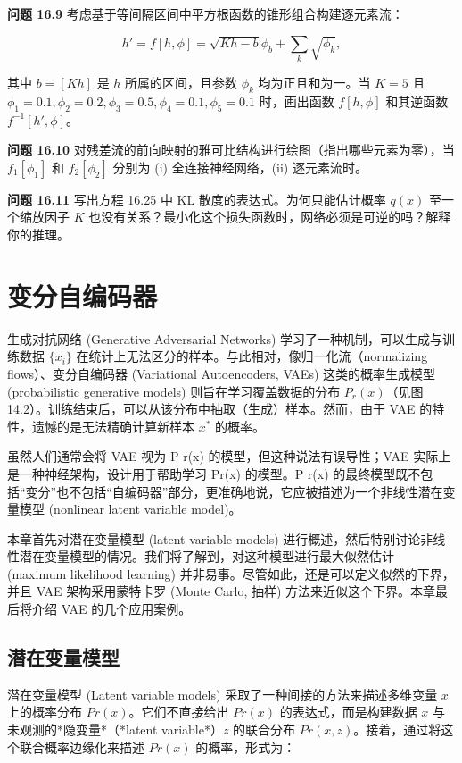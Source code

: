 \documentclass[lang=cn,newtx,10pt,scheme=chinese]{elegantbook}
\begin{document}
\textbf{问题 16.9} 考虑基于等间隔区间中平方根函数的锥形组合构建逐元素流：

\begin{equation}
h' = f[h, \phi] = \sqrt{K h - b} \phi_b + \sum_{k} \sqrt{\phi_k}, 
\end{equation}

其中 \(b = [Kh]\) 是 \(h\) 所属的区间，且参数 \(\phi_k\) 均为正且和为一。当 \(K = 5\) 且 \(\phi_1 = 0.1, \phi_2 = 0.2, \phi_3 = 0.5, \phi_4 = 0.1, \phi_5 = 0.1\) 时，画出函数 \(f[h, \phi]\) 和其逆函数 \(f^{-1}[h', \phi]\)。

\textbf{问题 16.10} 对残差流的前向映射的雅可比结构进行绘图（指出哪些元素为零），当 \(f_1[\phi_1]\) 和 \(f_2[\phi_2]\) 分别为 (i) 全连接神经网络，(ii) 逐元素流时。

\textbf{问题 16.11} 写出方程 16.25 中 KL 散度的表达式。为何只能估计概率 \(q(x)\) 至一个缩放因子 \(K\) 也没有关系？最小化这个损失函数时，网络必须是可逆的吗？解释你的推理。

\chapter{变分自编码器}

生成对抗网络 (Generative Adversarial Networks) 学习了一种机制，可以生成与训练数据 \(\{x_i\}\) 在统计上无法区分的样本。与此相对，像归一化流（normalizing flows）、变分自编码器 (Variational Autoencoders, VAEs) 这类的概率生成模型 (probabilistic generative models) 则旨在学习覆盖数据的分布 \(P_r(x)\)（见图 14.2）。训练结束后，可以从该分布中抽取（生成）样本。然而，由于 VAE 的特性，遗憾的是无法精确计算新样本 \(x^*\) 的概率。

虽然人们通常会将 VAE 视为 P r(x) 的模型，但这种说法有误导性；VAE 实际上是一种神经架构，设计用于帮助学习 Pr(x) 的模型。P r(x) 的最终模型既不包括“变分”也不包括“自编码器”部分，更准确地说，它应被描述为一个非线性潜在变量模型 (nonlinear latent variable model)。

本章首先对潜在变量模型 (latent variable models) 进行概述，然后特别讨论非线性潜在变量模型的情况。我们将了解到，对这种模型进行最大似然估计 (maximum likelihood learning) 并非易事。尽管如此，还是可以定义似然的下界，并且 VAE 架构采用蒙特卡罗 (Monte Carlo, 抽样) 方法来近似这个下界。本章最后将介绍 VAE 的几个应用案例。
\section{潜在变量模型}

潜在变量模型 (Latent variable models) 采取了一种间接的方法来描述多维变量 \(x\) 上的概率分布 \(Pr(x)\)。它们不直接给出 \(Pr(x)\) 的表达式，而是构建数据 \(x\) 与未观测的*隐变量*（*latent variable*）\(z\) 的联合分布 \(Pr(x, z)\)。接着，通过将这个联合概率边缘化来描述 \(Pr(x)\) 的概率，形式为：
\end{document}
